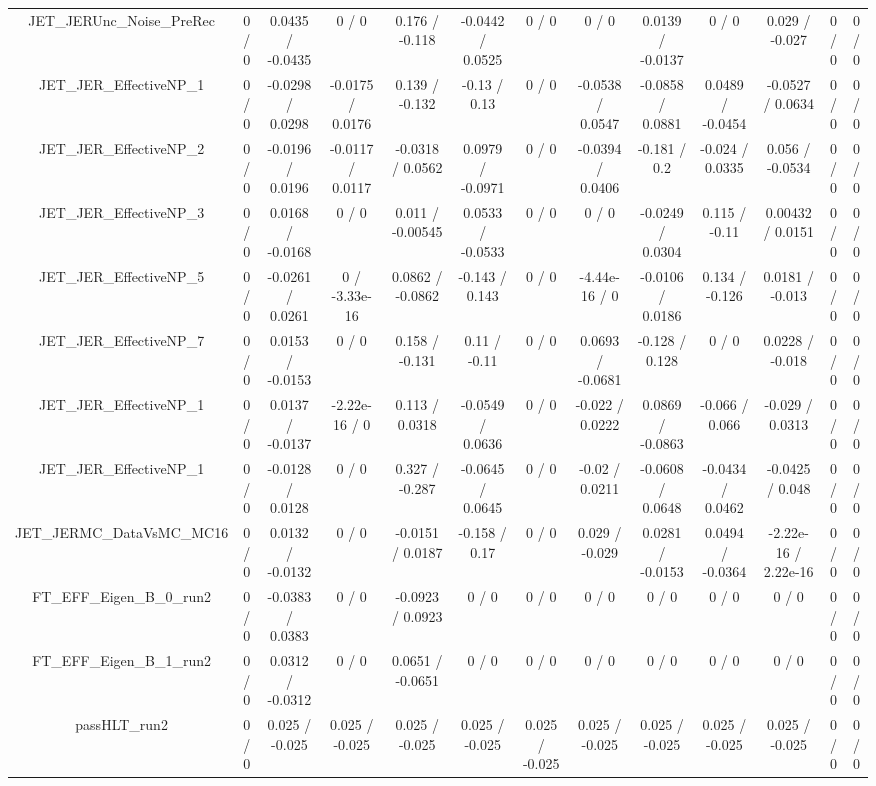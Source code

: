 \documentclass[10pt]{article}
\begin{document}
\begin{table}[htbp]
\begin{center}
\begin{tabular}{|c|c|c|c|c|c|c|c|c|c|c|c|c|}
  JET_JERUnc_Noise_PreRec & 0 / 0 & 0.0435 / -0.0435 & 0 / 0 & 0.176 / -0.118 & -0.0442 / 0.0525 & 0 / 0 & 0 / 0 & 0.0139 / -0.0137 & 0 / 0 & 0.029 / -0.027 & 0 / 0 & 0 / 0 \\ 
  JET_JER_EffectiveNP_1 & 0 / 0 & -0.0298 / 0.0298 & -0.0175 / 0.0176 & 0.139 / -0.132 & -0.13 / 0.13 & 0 / 0 & -0.0538 / 0.0547 & -0.0858 / 0.0881 & 0.0489 / -0.0454 & -0.0527 / 0.0634 & 0 / 0 & 0 / 0 \\ 
  JET_JER_EffectiveNP_2 & 0 / 0 & -0.0196 / 0.0196 & -0.0117 / 0.0117 & -0.0318 / 0.0562 & 0.0979 / -0.0971 & 0 / 0 & -0.0394 / 0.0406 & -0.181 / 0.2 & -0.024 / 0.0335 & 0.056 / -0.0534 & 0 / 0 & 0 / 0 \\ 
  JET_JER_EffectiveNP_3 & 0 / 0 & 0.0168 / -0.0168 & 0 / 0 & 0.011 / -0.00545 & 0.0533 / -0.0533 & 0 / 0 & 0 / 0 & -0.0249 / 0.0304 & 0.115 / -0.11 & 0.00432 / 0.0151 & 0 / 0 & 0 / 0 \\ 
  JET_JER_EffectiveNP_5 & 0 / 0 & -0.0261 / 0.0261 & 0 / -3.33e-16 & 0.0862 / -0.0862 & -0.143 / 0.143 & 0 / 0 & -4.44e-16 / 0 & -0.0106 / 0.0186 & 0.134 / -0.126 & 0.0181 / -0.013 & 0 / 0 & 0 / 0 \\ 
  JET_JER_EffectiveNP_7 & 0 / 0 & 0.0153 / -0.0153 & 0 / 0 & 0.158 / -0.131 & 0.11 / -0.11 & 0 / 0 & 0.0693 / -0.0681 & -0.128 / 0.128 & 0 / 0 & 0.0228 / -0.018 & 0 / 0 & 0 / 0 \\ 
  JET_JER_EffectiveNP_1 & 0 / 0 & 0.0137 / -0.0137 & -2.22e-16 / 0 & 0.113 / 0.0318 & -0.0549 / 0.0636 & 0 / 0 & -0.022 / 0.0222 & 0.0869 / -0.0863 & -0.066 / 0.066 & -0.029 / 0.0313 & 0 / 0 & 0 / 0 \\ 
  JET_JER_EffectiveNP_1 & 0 / 0 & -0.0128 / 0.0128 & 0 / 0 & 0.327 / -0.287 & -0.0645 / 0.0645 & 0 / 0 & -0.02 / 0.0211 & -0.0608 / 0.0648 & -0.0434 / 0.0462 & -0.0425 / 0.048 & 0 / 0 & 0 / 0 \\ 
  JET_JERMC_DataVsMC_MC16 & 0 / 0 & 0.0132 / -0.0132 & 0 / 0 & -0.0151 / 0.0187 & -0.158 / 0.17 & 0 / 0 & 0.029 / -0.029 & 0.0281 / -0.0153 & 0.0494 / -0.0364 & -2.22e-16 / 2.22e-16 & 0 / 0 & 0 / 0 \\ 
  FT_EFF_Eigen_B_0_run2 & 0 / 0 & -0.0383 / 0.0383 & 0 / 0 & -0.0923 / 0.0923 & 0 / 0 & 0 / 0 & 0 / 0 & 0 / 0 & 0 / 0 & 0 / 0 & 0 / 0 & 0 / 0 \\ 
  FT_EFF_Eigen_B_1_run2 & 0 / 0 & 0.0312 / -0.0312 & 0 / 0 & 0.0651 / -0.0651 & 0 / 0 & 0 / 0 & 0 / 0 & 0 / 0 & 0 / 0 & 0 / 0 & 0 / 0 & 0 / 0 \\ 
  passHLT_run2 & 0 / 0 & 0.025 / -0.025 & 0.025 / -0.025 & 0.025 / -0.025 & 0.025 / -0.025 & 0.025 / -0.025 & 0.025 / -0.025 & 0.025 / -0.025 & 0.025 / -0.025 & 0.025 / -0.025 & 0 / 0 & 0 / 0 \\ 

\end{tabular}
\end{center}
\end{table}
\end{document}

